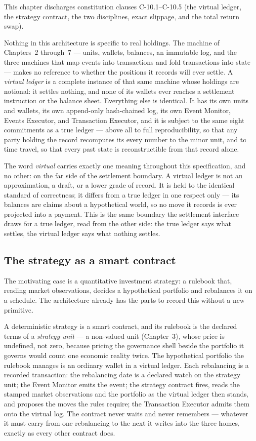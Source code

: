 \documentclass[11pt,a4paper]{article}
\begin{document}
This chapter discharges constitution clauses C-10.1--C-10.5 (the virtual ledger, the strategy contract, the two disciplines, exact slippage, and the total return swap).

Nothing in this architecture is specific to real holdings. The machine of
Chapters~2 through~7 --- units, wallets, balances, an immutable log, and the
three machines that map events into transactions and fold transactions into
state --- makes no reference to whether the positions it records will ever
settle. A \emph{virtual ledger} is a complete instance of that same machine
whose holdings are notional: it settles nothing, and none of its wallets ever
reaches a settlement instruction or the balance sheet. Everything else is
identical. It has its own units and wallets, its own append-only hash-chained
log, its own Event Monitor, Events Executor, and Transaction Executor, and it is
subject to the same eight commitments as a true ledger --- above all to full
reproducibility, so that any party holding the record recomputes its every
number to the minor unit, and to time travel, so that every past state is
reconstructible from that record alone.

The word \emph{virtual} carries exactly one meaning throughout this
specification, and no other: on the far side of the settlement boundary. A
virtual ledger is not an approximation, a draft, or a lower grade of record. It
is held to the identical standard of correctness; it differs from a true ledger
in one respect only --- its balances are claims about a hypothetical world, so
no move it records is ever projected into a payment. This is the same boundary
the settlement interface draws for a true ledger, read from the other side: the
true ledger says what settles, the virtual ledger says what nothing settles.

\subsection{The strategy as a smart contract}

The motivating case is a quantitative investment strategy: a rulebook that,
reading market observations, decides a hypothetical portfolio and rebalances it
on a schedule. The architecture already has the parts to record this without a
new primitive.

A deterministic strategy is a smart contract, and its rulebook is the declared
terms of a \emph{strategy unit} --- a non-valued unit (Chapter~3), whose price is
undefined, not zero, because pricing the governance shell beside the portfolio it
governs would count one economic reality twice. The hypothetical portfolio the
rulebook manages is an ordinary wallet in a virtual ledger. Each rebalancing is a
recorded transaction: the rebalancing date is a declared watch on the strategy
unit; the Event Monitor emits the event; the strategy contract fires, reads the
stamped market observations and the portfolio as the virtual ledger then stands,
and proposes the moves the rules require; the Transaction Executor admits them
onto the virtual log. The contract never waits and never remembers --- whatever
it must carry from one rebalancing to the next it writes into the three homes,
exactly as every other contract does.
\end{document}
